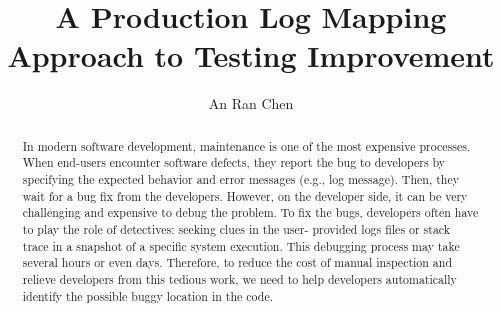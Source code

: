 \documentclass[sigconf]{acmart}
\begin{document}
\title{A Production Log Mapping Approach to Testing Improvement}

\author{An Ran Chen}

\begin{abstract}
	In modern software development, maintenance is one of the most expensive processes. When end-users encounter software defects, they report the bug to developers by specifying the expected behavior and error messages (e.g., log message). Then, they wait for a bug fix from the developers. However, on the developer side, it can be very challenging and expensive to debug the problem. To fix the bugs, developers often have to play the role of detectives: seeking clues in the user- provided logs files or stack trace in a snapshot of a specific system execution. This debugging process may take several hours or even days. Therefore, to reduce the cost of manual inspection and relieve developers from this tedious work, we need to help developers automatically identify the possible buggy location in the code.
\end{abstract}




\maketitle
% 





\end{document}
